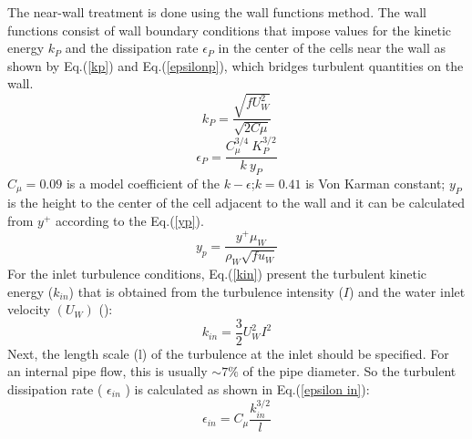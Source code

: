 \documentclass[11pt]{report}
\begin{document}
 The near-wall treatment is done using the wall functions method. 
 The wall functions consist of wall boundary conditions that impose values for the kinetic energy $k_{P}$ and the dissipation rate $\epsilon_{P}$  in the center of the cells near the wall as shown by Eq.(\ref{kp}) and Eq.(\ref{epsilonp}), which bridges turbulent quantities on the wall.
%
 \begin{equation}
 k_{P} =\frac{\sqrt{f {U_{W}^2 }}}{\sqrt{2 C\mu }}
 \label{kp}
 \end{equation}
%
 \begin{equation}
 \epsilon_{P} =\frac{C^{3/4}_{\mu } \ K^{3/2}_{P}}{k\ y_{P}}
 \label{epsilonp}
 \end{equation}
 \(C_{\mu}=0.09\) is a model coefficient of the \(k-\epsilon\);\quad $k=0.41$ is Von Karman constant; 
  $y_{P}$ is the height to the center of the cell adjacent to the wall and it can be calculated from $y^+$ according to the Eq.(\ref{yp}).
%
 \begin{equation}
y_{p}=\frac{y^{+} \mu_W}{\rho_W\sqrt{f u_{W}}}
 \label{yp}
 \end{equation}
%
For the inlet turbulence conditions, Eq.(\ref{kin}) present the turbulent kinetic energy (\(k_{in}\)) that is obtained from the turbulence intensity (\(I\)) and the water inlet velocity \((U_W)\) (\citet{Messa-2020}):
%
 \begin{equation}
 k_{in} =\frac{3}{2} U_W^{2} I^{2} 
 \label{kin}
 \end{equation}
%
 Next, the length scale (l) of the turbulence at the inlet should be specified. 
%
For an internal pipe flow, this is usually \(\sim 7 \%\) of the pipe diameter. So the turbulent dissipation rate ( \(\epsilon_{in}\) ) is calculated as shown in Eq.(\ref{epsilon in}): 
%
 \begin{equation}
 \epsilon_{in}=C_{\mu} \frac{k_{in}^{3 / 2}}{l} 
 \label{epsilon in}
 \end{equation}
\end{document}
